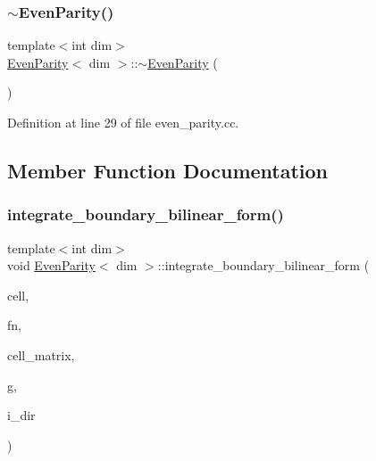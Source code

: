 \subsubsection{\texorpdfstring{$\sim$\+Even\+Parity()}{~EvenParity()}}
{\footnotesize\ttfamily template$<$int dim$>$ \\
\hyperlink{class_even_parity}{Even\+Parity}$<$ dim $>$\+::$\sim$\hyperlink{class_even_parity}{Even\+Parity} (\begin{DoxyParamCaption}{ }\end{DoxyParamCaption})}



Definition at line 29 of file even\+\_\+parity.\+cc.



\subsection{Member Function Documentation}
\mbox{\label{class_even_parity_ae800cb49f85cf417167ca5385b50df6f}} 
\subsubsection{\texorpdfstring{integrate\+\_\+boundary\+\_\+bilinear\+\_\+form()}{integrate\_boundary\_bilinear\_form()}}
{\footnotesize\ttfamily template$<$int dim$>$ \\
void \hyperlink{class_even_parity}{Even\+Parity}$<$ dim $>$\+::integrate\+\_\+boundary\+\_\+bilinear\+\_\+form (\begin{DoxyParamCaption}\item[{typename Do\+F\+Handler$<$ dim $>$\+::active\+\_\+cell\+\_\+iterator \&}]{cell,  }\item[{unsigned int \&}]{fn,  }\item[{Full\+Matrix$<$ double $>$ \&}]{cell\+\_\+matrix,  }\item[{const unsigned int \&}]{g,  }\item[{const unsigned int \&}]{i\+\_\+dir }\end{DoxyParamCaption})\hspace{0.3cm}{\ttfamily [virtual]}}



